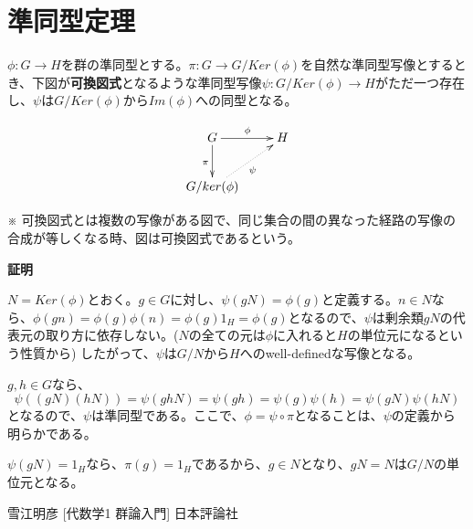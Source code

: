 \documentclass[dvipdfmx,autodetect-engine]{jsarticle}
\begin{document}
\section{準同型定理}


$\phi: G \to H$を群の準同型とする。$\pi: G \to G/Ker(\phi)$を自然な準同型写像とするとき、下図が{\bf 可換図式}となるような準同型写像$\psi: G/Ker(\phi) \to H$がただ一つ存在し、$\psi$は$G/Ker(\phi)$から$Im(\phi)$への同型となる。

\[
\xymatrix{
G \ar[r]^{\phi} \ar[d]_{\pi} & H \\
G/ker(\phi) \ar@{.>}[ru]_{\psi}
}
\]

※ 可換図式とは複数の写像がある図で、同じ集合の間の異なった経路の写像の合成が等しくなる時、図は可換図式であるという。

{\bf 証明}

$N = Ker(\phi)$とおく。$g \in G$に対し、$\psi(gN) = \phi(g)$と定義する。$n \in N$なら、$\phi(gn) = \phi(g)\phi(n) = \phi(g)1_H = \phi(g)$となるので、$\psi$は剰余類$gN$の代表元の取り方に依存しない。($N$の全ての元は$\phi$に入れると$H$の単位元になるという性質から)
したがって、$\psi$は$G/N$から$H$へのwell-definedな写像となる。

$g, h \in G$なら、
$$
\psi((gN)(hN)) = \psi(ghN) = \psi(gh) = \psi(g)\psi(h) =\psi(gN)\psi(hN)
$$
となるので、$\psi$は準同型である。ここで、$\phi = \psi \circ \pi$となることは、$\psi$の定義から明らかである。

$\psi(gN) = 1_H$なら、$\pi(g) = 1_H$であるから、$g \in N$となり、$gN = N$は$G/N$の単位元となる。


\begin{thebibliography}{n}
 雪江明彦 [代数学1 群論入門] 日本評論社
\end{thebibliography}
\end{document}
